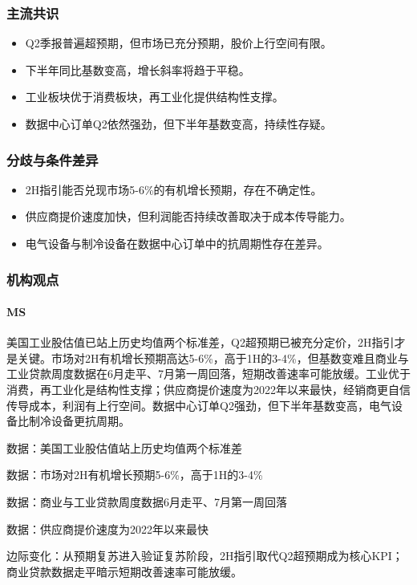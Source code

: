 \documentclass[11pt]{ctexart}
\begin{document}
\subsubsection*{主流共识}
\begin{itemize}
  \item Q2季报普遍超预期，但市场已充分预期，股价上行空间有限。
  \item 下半年同比基数变高，增长斜率将趋于平稳。
  \item 工业板块优于消费板块，再工业化提供结构性支撑。
  \item 数据中心订单Q2依然强劲，但下半年基数变高，持续性存疑。
\end{itemize}
\subsubsection*{分歧与条件差异}
\begin{itemize}
  \item 2H指引能否兑现市场5-6\%的有机增长预期，存在不确定性。
  \item 供应商提价速度加快，但利润能否持续改善取决于成本传导能力。
  \item 电气设备与制冷设备在数据中心订单中的抗周期性存在差异。
\end{itemize}
\subsubsection*{机构观点}
\paragraph{MS} 美国工业股估值已站上历史均值两个标准差，Q2超预期已被充分定价，2H指引才是关键。市场对2H有机增长预期高达5-6\%，高于1H的3-4\%，但基数变难且商业与工业贷款周度数据在6月走平、7月第一周回落，短期改善速率可能放缓。工业优于消费，再工业化是结构性支撑；供应商提价速度为2022年以来最快，经销商更自信传导成本，利润有上行空间。数据中心订单Q2强劲，但下半年基数变高，电气设备比制冷设备更抗周期。
{\small\color{refgray}数据：美国工业股估值站上历史均值两个标准差\par}
{\small\color{refgray}数据：市场对2H有机增长预期5-6\%，高于1H的3-4\%\par}
{\small\color{refgray}数据：商业与工业贷款周度数据6月走平、7月第一周回落\par}
{\small\color{refgray}数据：供应商提价速度为2022年以来最快\par}
{\small\color{refgray}边际变化：从预期复苏进入验证复苏阶段，2H指引取代Q2超预期成为核心KPI；商业贷款数据走平暗示短期改善速率可能放缓。\par}
\end{document}
